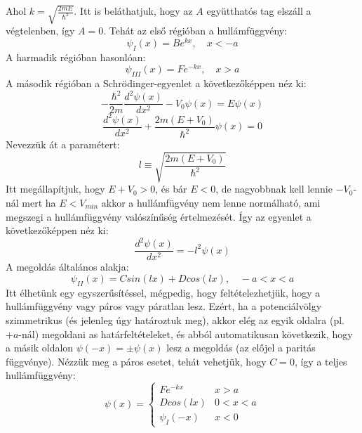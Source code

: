 \documentclass[../main.tex]{subfiles}
\begin{document}
Ahol $k = \sqrt{\frac{2mE}{\hbar^2}}$. Itt is beláthatjuk, hogy az $A$ együtthatós tag elszáll a végtelenben, így $A = 0$. Tehát az első régióban a hullámfüggvény:
\begin{equation}
    \psi_I(x) = B e^{kx}, \quad x < -a
\end{equation}
A harmadik régióban hasonlóan:
\begin{equation}
    \psi_{III}(x) = F e^{-kx}, \quad x > a
\end{equation}
A második régióban a Schrödinger-egyenlet a következőképpen néz ki:
\begin{equation}
   -\frac{\hbar^2}{2m} \frac{d^2 \psi(x)}{dx^2} - V_0 \psi(x) = E \psi(x)
\end{equation}
\begin{equation}
    \frac{d^2 \psi(x)}{dx^2} + \frac{2m(E + V_0)}{\hbar^2} \psi(x) = 0
\end{equation}
Nevezzük át a paramétert:
\begin{equation}
    l \equiv \sqrt{\frac{2m(E + V_0)}{\hbar^2}}
\end{equation}
Itt megállapítjuk, hogy $E + V_0 > 0$, és bár $E < 0$, de nagyobbnak kell lennie $- V_0$-nál mert ha $E < V_{min}$ akkor a hullámfügvény nem lenne normálható, ami megszegi a hullámfüggvény valószínűség értelmezését. Így az egyenlet a következőképpen néz ki:
\begin{equation}
    \frac{d^2 \psi(x)}{dx^2} = - l^2 \psi(x)
\end{equation}
A megoldás általános alakja:
\begin{equation}
    \psi_{II}(x) = C sin(l x) + D cos(l x), \quad -a < x < a
\end{equation}
Itt élhetünk egy egyszerűsítéssel, mégpedig, hogy feltételezhetjük, hogy a hullámfüggvény vagy páros vagy páratlan lesz. Ezért, ha a potenciálvölgy szimmetrikus (és jelenleg úgy határoztuk meg),
akkor elég az egyik oldalra (pl. $+ a$-nál) megoldani as határfeltételeket, és abból automatikusan következik, hogy a másik oldalon $\psi(-x) = \pm \psi(x)$ lesz a megoldás (az előjel a paritás függvénye).
Nézzük meg a páros esetet, tehát vehetjük, hogy $C = 0$, így a teljes hullámfüggvény:
\begin{equation}
\psi(x) = \begin{cases}
    F e^{-kx} & x > a \\
    D cos(l x) & 0 < x < a \\
    \psi_I(-x) & x < 0 
    \end{cases}
\end{equation}
\end{document}
